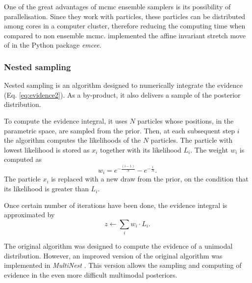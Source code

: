 One of the great advantages of \gls{mcmc} ensemble samplers  is its possibility of parallelisation. Since they work with particles, these particles can be distributed among cores in a computer cluster, therefore reducing the computing time when compared to non ensemble \gls{mcmc}. \citet{Foreman2013} implemented the affine invariant stretch move of \citet{Goodman2010} in the Python package \emph{emcee}. 
\subsubsection{Nested sampling}
\label{sect:NestedSampling}
Nested sampling \citep{Skilling2004,Skilling2006} is an algorithm designed to numerically integrate the evidence (Eq. \ref{eq:evidence2}). As a by-product, it also delivers a sample of the posterior distribution. 

{To compute the evidence integral, it uses $N$ particles whose positions, in the parametric space, are sampled from the prior. Then, at each subsequent step $i$ the algorithm computes the likelihoods of the $N$ particles. The particle with lowest likelihood is stored as $x_i$ together with its likelihood $L_{i}$. The weight $w_i$ is computed as}
\begin{equation}
w_i = e^{-\frac{(i-1)}{N}} - e^{-\frac{i}{N}}. \nonumber 
\end{equation}
{The particle $x_i$ is replaced with a new draw from the prior, on the condition that its likelihood is greater than $L_i$. }

{Once certain number of iterations have been done, the evidence integral is approximated by 
}\begin{equation}
z \leftarrow \sum_i w_i\cdot L_i.
\end{equation}

{The original algorithm was designed to compute the evidence of a unimodal distribution. However, an improved version of the original algorithm was implemented in \emph{MultiNest} \citep{Feroz2009}. This version allows the sampling and computing of evidence in the even more difficult multimodal posteriors.  }

